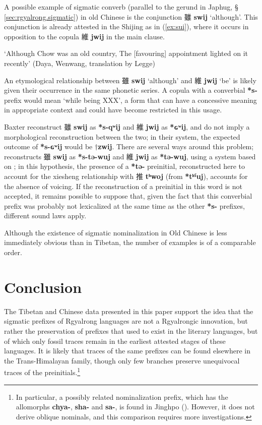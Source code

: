 \documentclass[oneside,a4paper,11pt]{article}
\newcommand{\ipa}[1]{\textbf{{\phon\mbox{#1}}}} %
\newcommand{\zh}[1]{{\cn #1}}
\newcommand{\zhc}[2]{\zh{#1} \ipa{#2}}
\begin{document}
 A possible example of sigmatic converb (parallel to the gerund in Japhug, § \ref{sec:rgyalrong.sigmatic}) in old Chinese is the conjunction \zhc{雖}{swij} `although'. This conjunction is already attested in the Shijing as in (\ref{ex:sui}),  where it occurs in opposition to the copula \zhc{維}{jwij}  in the main clause.
 
 \begin{exe}
\ex \label{ex:sui}
 \glt \zh{周雖舊邦，其命維新} 
 \glt `Although Chow was an old country, The [favouring] appointment lighted on it recently' (Daya, Wenwang, translation by Legge)
\end{exe}

An etymological relationship between \zhc{雖}{swij} `although' and \zhc{維}{jwij} `be' is likely given their occurrence in the same phonetic series. A copula with a converbial \ipa{*s-} prefix would mean `while being XXX', a form that can have a concessive meaning in appropriate context and could have become restricted in this usage.

Baxter reconstruct \zhc{雖}{swij} as \ipa{*s-qʷij} and \zhc{維}{jwij} as  \ipa{*ɢʷij}, and do not imply a morphological reconstruction between the two; in their system, the expected outcome of \ipa{*s-ɢʷij} would be $\dagger$\ipa{zwij}. There are several ways around this problem; \citet{jacques00ywij} reconstructs \zhc{雖}{swij} as \ipa{*s-tə-wuj} and  \zhc{維}{jwij} as  \ipa{*tə-wuj}, using a system based on \citet{sagart99roc}; in this hypothesis, the presence of a \ipa{*tə-} preinitial, reconstructed here to account for the xiesheng relationship with \zhc{推}{tʰwoj} (from \ipa{*tʰˁuj}), accounts for the absence of voicing. If the reconstruction of a preinitial in this word is not accepted, it remains possible to suppose that, given the fact that this converbial prefix was probably not lexicalized at the same time as the other \ipa{*s-} prefixes, different sound laws apply.

 Although the existence of sigmatic nominalization in Old Chinese is less immediately obvious than in Tibetan, the number of examples is of a comparable order.

\section{Conclusion}
The Tibetan and Chinese data presented in this paper support the idea that the sigmatic prefixes of Rgyalrong languages are not a Rgyalrongic innovation, but rather the preservation of  prefixes that used to exist in the literary languages, but of which only fossil traces remain in the earliest attested stages of these languages. It is likely that traces of the same prefixes can be found elsewhere in the Trans-Himalayan family, though only few branches preserve unequivocal traces of the preinitials.\footnote{In particular, a possibly related nominalization prefix, which has the allomorphs \ipa{chya-}, \ipa{sha-} and \ipa{sa-}, is found in Jinghpo (\citealt[3-4]{dai90yufa}). However, it does not derive oblique nominals, and this comparison requires more investigations. }
\end{document}
